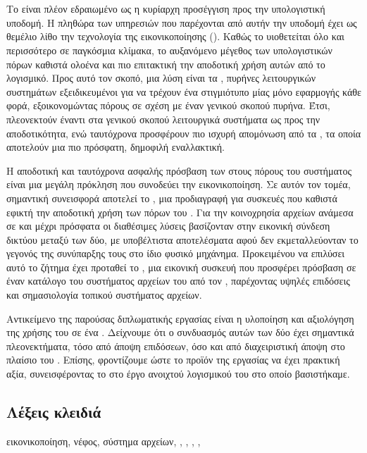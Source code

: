 \chapter*{\abstractname}

Το  είναι πλέον εδραιωμένο ως η κυρίαρχη προσέγγιση προς την
υπολογιστική υποδομή. Η πληθώρα των υπηρεσιών που παρέχονται από αυτήν την
υποδομή έχει ως θεμέλιο λίθο την τεχνολογία της εικονικοποίησης
(). Καθώς το  υιοθετείται όλο και περισσότερο σε
παγκόσμια κλίμακα, το αυξανόμενο μέγεθος των υπολογιστικών πόρων καθιστά
ολοένα και πιο επιτακτική την αποδοτική χρήση αυτών από το λογισμικό. Προς αυτό
τον σκοπό, μια λύση είναι τα \emph{}, πυρήνες λειτουργικών
συστημάτων εξειδικευμένοι για να τρέχουν ένα στιγμιότυπο μίας μόνο εφαρμογής
κάθε φορά, εξοικονομώντας πόρους σε σχέση με έναν γενικού σκοπού πυρήνα. Έτσι,
πλεονεκτούν έναντι στα γενικού σκοπού λειτουργικά συστήματα ως προς την
αποδοτικότητα, ενώ ταυτόχρονα προσφέρουν πιο ισχυρή απομόνωση από τα
, τα οποία αποτελούν μια πιο πρόσφατη, δημοφιλή εναλλακτική.

Η αποδοτική και ταυτόχρονα ασφαλής πρόσβαση των  στους
πόρους του \host{} συστήματος είναι μια μεγάλη πρόκληση που συνοδεύει την
εικονικοποίηση. Σε αυτόν τον τομέα, σημαντική συνεισφορά αποτελεί το
\emph{}, μια προδιαγραφή για  συσκευές που
καθιστά εφικτή την αποδοτική χρήση των πόρων του \host{}. Για την κοινοχρησία
αρχείων ανάμεσα σε \host{} και \guest{} μέχρι πρόσφατα οι διαθέσιμες λύσεις
βασίζονταν στην εικονική σύνδεση δικτύου μεταξύ των δύο, με υποβέλτιστα
αποτελέσματα αφού δεν εκμεταλλεύονταν το γεγονός της συνύπαρξης τους στο ίδιο
φυσικό μηχάνημα. Προκειμένου να επιλύσει αυτό το ζήτημα έχει προταθεί το
\emph{\viofs{}}, μια εικονική  συσκευή που προσφέρει πρόσβαση
σε έναν κατάλογο του συστήματος αρχείων του \host{} από τον \guest{},
παρέχοντας υψηλές επιδόσεις και σημασιολογία τοπικού συστήματος αρχείων.

Αντικείμενο της παρούσας διπλωματικής εργασίας είναι η υλοποίηση και αξιολόγηση
της χρήσης του \viofs{} σε ένα . Δείχνουμε ότι ο συνδυασμός αυτών
των δύο έχει σημαντικά πλεονεκτήματα, τόσο από άποψη επιδόσεων, όσο και από
διαχειριστική άποψη στο πλαίσιο του . Επίσης, φροντίζουμε ώστε το
προϊόν της εργασίας να έχει πρακτική αξία, συνεισφέροντας το στο έργο ανοιχτού
λογισμικού του  στο οποίο βασιστήκαμε.

\section*{Λέξεις κλειδιά}
\noindent
εικονικοποίηση, νέφος, σύστημα αρχείων, , , \osv{},
\viofs{}, \qemu{}
